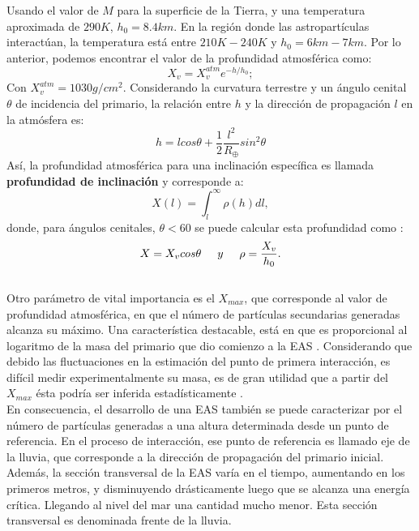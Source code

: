 Usando el valor de $M$ para la superficie de la Tierra, y una temperatura aproximada de $290 K$, $h_{0} = 8.4 km$. En la región donde las astropartículas interactúan, la temperatura está entre $210 K - 240 K$ y $h_{0} = 6 km - 7 km$.
Por lo anterior, podemos encontrar el valor de la profundidad atmosférica como:
\begin{equation}
    X_{v} = X_{v}^{atm} e^{-h/h_{0}};
    \label{eq:eq7}
\end{equation}
Con $X_{v}^{atm} = 1030 g/cm^{2}$.
Considerando la curvatura terrestre y un ángulo cenital $\theta$ de incidencia del primario, la relación entre $h$ y la dirección de propagación $l$ en la atmósfera es:
\begin{equation}
    h=lcos\theta + \frac{1}{2}\frac{l^2}{R_{\oplus}}sin^{2}\theta
    \label{eq:eq8}
\end{equation}{}
Así, la profundidad atmosférica para una inclinación específica es llamada \textbf{profundidad de inclinación} y corresponde a:
\begin{equation}
X(l) = \int_{l}^{\infty} \rho (h) dl,
\label{eq:eq9}
\end{equation}
donde, para ángulos cenitales, $\theta < 60 $ se puede calcular esta profundidad como \parencite{mauro:oxigen}:
\begin{equation}
X = X_{v}cos\theta \hspace{0.5cm} y  \hspace{0.5cm} \rho = \frac{X_{v}}{h_{0}}.
\label{eq:eq10}
\end{equation}\\
Otro parámetro de vital importancia es el $X_{max}$, que corresponde al valor de profundidad atmosférica, en que el número de partículas secundarias generadas alcanza su máximo. Una característica destacable, está en que es proporcional al logaritmo de la masa del primario que dio comienzo a la EAS \parencite{Xmax}. Considerando que debido las fluctuaciones en la estimación del punto de primera interacción, es difícil medir experimentalmente su masa, es de gran utilidad que a partir del $X_{max}$ ésta podría ser inferida estadísticamente \parencite{Xmax}.\\

En consecuencia, el desarrollo de una EAS también se puede caracterizar por el número de partículas generadas a una altura determinada desde un punto de referencia. En el proceso de interacción, ese punto de referencia es llamado eje de la lluvia, que corresponde a la dirección de propagación del primario inicial. Además, la sección transversal de la EAS varía en el tiempo, aumentando en los primeros metros, y disminuyendo drásticamente luego que se alcanza una energía crítica. Llegando al nivel del mar una cantidad mucho menor. Esta sección transversal es denominada frente de la lluvia. \\

